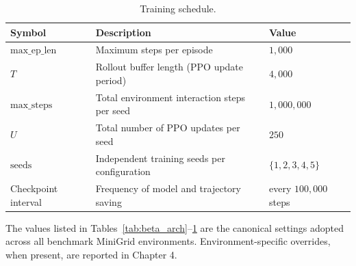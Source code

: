 \begin{table}[H]
\centering
\caption{Training schedule.}
\label{tab:training_schedule}
\begin{tabular}{|l|p{7.5cm}|l|}
\hline
\textbf{Symbol} & \textbf{Description} & \textbf{Value} \\
\hline
$\text{max\_ep\_len}$ & Maximum steps per episode & $1{,}000$ \\
\hline
$T$ & Rollout buffer length (PPO update period) & $4{,}000$ \\
\hline
$\text{max\_steps}$ & Total environment interaction steps per seed & $1{,}000{,}000$ \\
\hline
$U$ & Total number of PPO updates per seed & $250$ \\
\hline
$\text{seeds}$ & Independent training seeds per configuration & $\{1, 2, 3, 4, 5\}$ \\
\hline
Checkpoint interval & Frequency of model and trajectory saving & every $100{,}000$ steps \\
\hline
\end{tabular}
\end{table}

The values listed in Tables~\ref{tab:beta_arch}--\ref{tab:training_schedule} are the canonical settings adopted across all benchmark MiniGrid environments. Environment-specific overrides, when present, are reported in Chapter 4.
